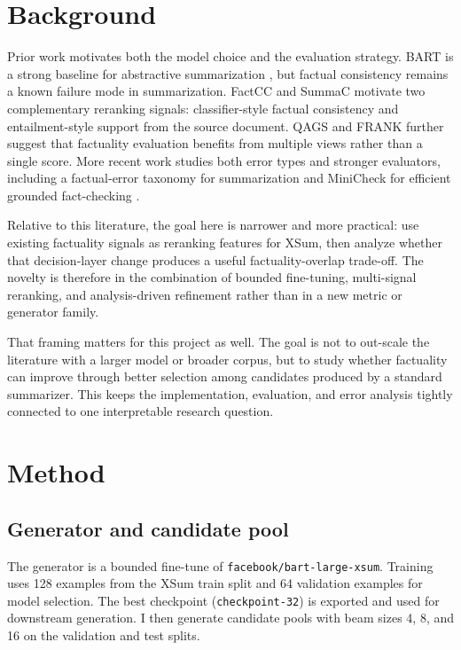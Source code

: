 \documentclass[11pt]{article}
\begin{document}
\section{Background}

Prior work motivates both the model choice and the evaluation strategy. BART is
a strong baseline for abstractive summarization \citep{lewis2020bart}, but
factual consistency remains a known failure mode in summarization. FactCC
\citep{kryscinski2020factcc} and SummaC \citep{laban2022summac} motivate two
complementary reranking signals: classifier-style factual consistency and
entailment-style support from the source document. QAGS
\citep{wang2020qags} and FRANK \citep{pagnoni2021frank} further suggest that
factuality evaluation benefits from multiple views rather than a single score.
More recent work studies both error types and stronger evaluators, including a
factual-error taxonomy for summarization \citep{tang2023errors} and MiniCheck
for efficient grounded fact-checking \citep{tang2024minicheck}.

Relative to this literature, the goal here is narrower and more practical: use
existing factuality signals as reranking features for XSum, then analyze
whether that decision-layer change produces a useful factuality-overlap
trade-off. The novelty is therefore in the combination of bounded fine-tuning,
multi-signal reranking, and analysis-driven refinement rather than in a new
metric or generator family.

That framing matters for this project as well. The goal is not to out-scale the
literature with a larger model or broader corpus, but to study whether
factuality can improve through better selection among candidates produced by a
standard summarizer. This keeps the implementation, evaluation, and error
analysis tightly connected to one interpretable research question.

\section{Method}

\subsection{Generator and candidate pool}

The generator is a bounded fine-tune of
\texttt{facebook/bart-large-xsum}. Training uses 128 examples from the XSum
train split and 64 validation examples for model selection. The best
checkpoint (\texttt{checkpoint-32}) is exported and used for downstream
generation. I then generate candidate pools with beam sizes 4, 8, and 16 on
the validation and test splits.
\end{document}
